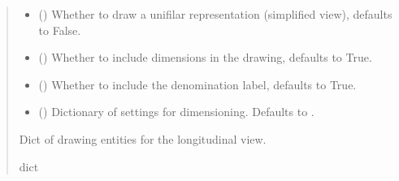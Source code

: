 \documentclass[a4paper,10pt,english]{sphinxmanual}
\begin{document}
\begin{fulllineitems}
\begin{fulllineitems}
\begin{quote}
\begin{description}
\begin{itemize}
\item {} 
\sphinxAtStartPar
{} (\sphinxstyleliteralemphasis{\sphinxupquote{, }}) \textendash{} Whether to draw a unifilar representation (simplified view), defaults to False.

\item {} 
\sphinxAtStartPar
{} (\sphinxstyleliteralemphasis{\sphinxupquote{, }}) \textendash{} Whether to include dimensions in the drawing, defaults to True.

\item {} 
\sphinxAtStartPar
{} (\sphinxstyleliteralemphasis{\sphinxupquote{, }}) \textendash{} Whether to include the denomination label, defaults to True.

\item {} 
\sphinxAtStartPar
{} (\sphinxstyleliteralemphasis{\sphinxupquote{, }}) \textendash{} Dictionary of settings for dimensioning. Defaults to .

\end{itemize}

\sphinxAtStartPar
Dict of drawing entities for the longitudinal view.

\sphinxAtStartPar
dict

\end{description}\end{quote}

\end{fulllineitems}



\end{fulllineitems}
\end{document}
